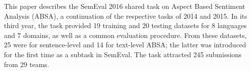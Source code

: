This paper describes the SemEval 2016 shared task on Aspect Based Sentiment Analysis (ABSA), a continuation of the respective tasks of 2014 and 2015. In its third year, the task provided 19 training and 20 testing datasets for 8 languages and 7 domains, as well as a common evaluation procedure. From these datasets, 25 were for sentence-level and 14 for text-level ABSA; the latter was introduced for the first time as a subtask in SemEval. The task attracted 245 submissions from 29 teams.
